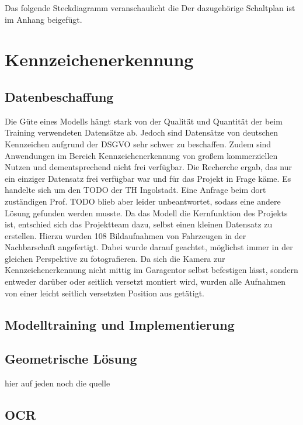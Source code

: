 Das folgende Steckdiagramm veranschaulicht die 
Der dazugehörige Schaltplan ist im Anhang beigefügt.

\nocite{*}

\chapter{Kennzeichenerkennung}

\section{Datenbeschaffung}
Die Güte eines Modells hängt stark von der Qualität und Quantität der beim Training verwendeten Datensätze ab. Jedoch sind Datensätze von deutschen Kennzeichen aufgrund der \ac{DSGVO} sehr schwer zu beschaffen. Zudem sind Anwendungen im Bereich Kennzeichenerkennung von großem kommerziellen Nutzen und dementsprechend nicht frei verfügbar. Die Recherche ergab, das nur ein einziger Datensatz frei verfügbar war und für das Projekt in Frage käme. Es handelte sich um den TODO der TH Ingolstadt. Eine Anfrage beim dort zuständigen Prof. TODO blieb aber leider unbeantwortet, sodass eine andere Lösung gefunden werden musste.
Da das Modell die Kernfunktion des Projekts ist, entschied sich das Projektteam dazu, selbst einen kleinen Datensatz zu erstellen. 
Hierzu wurden 108 Bildaufnahmen von Fahrzeugen in der Nachbarschaft angefertigt. Dabei wurde darauf geachtet, möglichst immer in der gleichen Perspektive zu fotografieren. Da sich die Kamera zur Kennzeichenerkennung nicht mittig im Garagentor selbst befestigen lässt, sondern entweder darüber oder seitlich versetzt montiert wird, wurden alle Aufnahmen von einer leicht seitlich versetzten Position aus getätigt.

\section{Modelltraining und Implementierung}

\section{Geometrische Lösung}
hier auf jeden noch die quelle 

\section{OCR}

